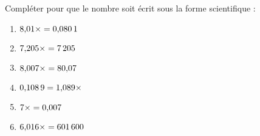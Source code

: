\begin{minipage}{0.99\linewidth}

\exo



Compléter pour que le nombre soit écrit sous la forme scientifique :
  
  \begin{multicols}{3}
    \noindent
    \begin{enumerate}
    \item $8{,}01\times\dotfill=0{,}080\,1$
    \item $7{,}205\times\dotfill=7\,205$
    \item $8{,}007\times\dotfill=80{,}07$
    \item $0{,}108\,9=1{,}089\times\dotfill$
    \item $7\times\dotfill=0{,}007$
    \item $6{,}016\times\dotfill=601\,600$
    \end{enumerate}
  \end{multicols}


\end{minipage}

\vspace{0.5cm}
